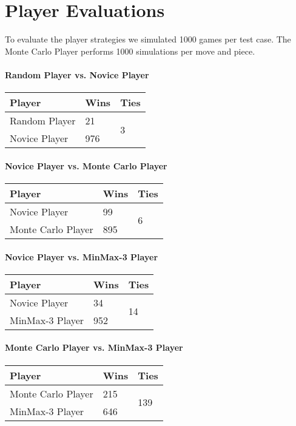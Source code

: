\chapter{Player Evaluations}
\label{ch:evaluations}
To evaluate the player strategies we simulated 1000 games per test case. The Monte Carlo Player performs 1000 simulations per move and piece.
\subsubsection*{Random Player vs. Novice Player}
\begin{table}[h]
	\centering
	\begin{tabular}[h]{l|l|l}
		\textbf{Player} & \textbf{Wins} & \textbf{Ties}\\
		\hline
		Random Player & 21 & \multirow{2}{*}{3}	\\
		Novice Player & 976 &	\\
	\end{tabular}
\end{table}
\subsubsection*{Novice Player vs. Monte Carlo Player}
\begin{table}[h]
	\centering
	\begin{tabular}[h]{l|l|l}
		\textbf{Player} & \textbf{Wins} & \textbf{Ties}\\
		\hline
		Novice Player & 99 & \multirow{2}{*}{6}	\\
		Monte Carlo Player & 895 &	\\
	\end{tabular}
\end{table}
\subsubsection*{Novice Player vs. MinMax-3 Player}
\begin{table}[h]
	\centering
	\begin{tabular}[h]{l|l|l}
		\textbf{Player} & \textbf{Wins} & \textbf{Ties}\\
		\hline
		Novice Player & 34 & \multirow{2}{*}{14}	\\
		MinMax-3 Player & 952 &	\\
	\end{tabular}
\end{table}
\pagebreak
\subsubsection*{Monte Carlo Player vs. MinMax-3 Player}
\begin{table}[h]
	\centering
	\begin{tabular}[h]{l|l|l}
		\textbf{Player} & \textbf{Wins} & \textbf{Ties}\\
		\hline
		Monte Carlo Player & 215 & \multirow{2}{*}{139}	\\
		MinMax-3 Player & 646 &	\\
	\end{tabular}
\end{table}
